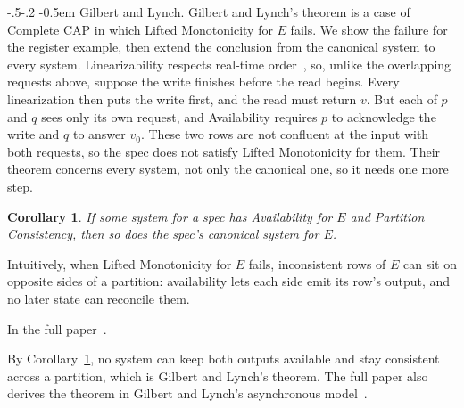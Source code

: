\documentclass[sigconf]{cidr-2027}
\makeatletter
\newtheorem{corollary}{Corollary}
\theoremstyle{remark}
\renewcommand\paragraph{\@startsection{paragraph}{4}{\z@}%
  {-.5\baselineskip \@plus -2\p@ \@minus -.2\p@}%
  {-0.5em}%
  {\normalfont\bfseries}}
\newcommand{\indesc}{input extension\xspace} %
\newcommand{\outrelbase}{extend\xspace}       %
\newcommand{\outnoun}{output extension\xspace}%
\newcommand{\fiber}[1]{P(#1)}
\newcommand{\fullproof}{Complete proof in the full paper~\cite{hellerstein2026completecalmfull}.}
\newcommand{\proofinfull}{\par\pushQED{\qed}\normalfont\topsep2\p@\relax
  \trivlist\item[\@proofindent\hskip\labelsep{\@proofnamefont\proofname\@addpunct{.}}]%
  \ignorespaces In the full paper~\cite{hellerstein2026completecalmfull}.%
  \popQED\endtrivlist\@endpefalse}
\renewenvironment{proof}[1][\proofname]{\par
  \pushQED{\qed}\normalfont\topsep2\p@\relax
  \trivlist\item[\@proofindent\hskip\labelsep{\@proofnamefont #1\@addpunct{.}}]\ignorespaces
}{\popQED\endtrivlist\@endpefalse}
\makeatother
\begin{document}
\paragraph{Gilbert and Lynch.}
Gilbert and Lynch's theorem is a case of Complete CAP in which Lifted
Monotonicity for $E$ fails.  We show the failure for the register example, then
extend the conclusion from the canonical system to every system.  Linearizability
respects real-time order~\cite{herlihy1990linearizability}, so, unlike the
overlapping requests above, suppose the write finishes before the read begins.  Every linearization then puts the write
first, and the read must return $v$.  But each of $p$ and $q$ sees only its own
request, and Availability requires $p$ to acknowledge the write and $q$ to
answer $v_0$.  These two rows are not confluent at the input with both
requests, so the spec does not satisfy Lifted Monotonicity for them.  Their theorem concerns
every system, not only the canonical one, so it needs one more step.

\begin{corollary}
\label{cor:complete-cap-any-system}
If some system for a spec has Availability for $E$ and Partition Consistency,
then so does the spec's canonical system for $E$.
\end{corollary}

Intuitively, when Lifted Monotonicity for $E$ fails, inconsistent rows of $E$
can sit on opposite sides of a partition:
availability lets each side emit its row's output, and no later state can
reconcile them.
\proofinfull

By Corollary~\ref{cor:complete-cap-any-system}, no system can keep both outputs
available and stay consistent across a partition, which is Gilbert and Lynch's
theorem.  The full paper also derives the theorem in Gilbert and Lynch's asynchronous
model~\cite{hellerstein2026completecalmfull}.

\end{document}
